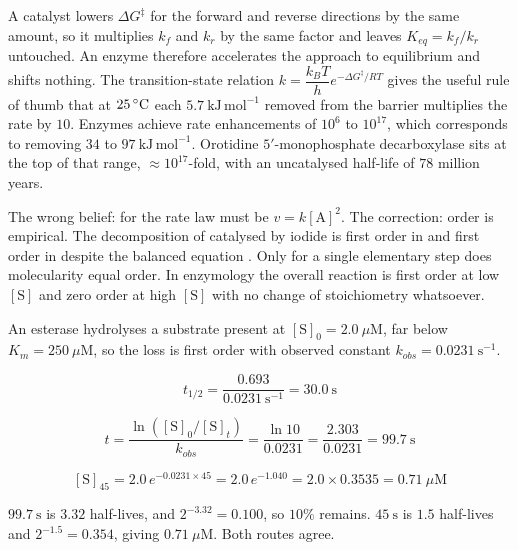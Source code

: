 \begin{thmbox}[title={PRINCIPLE: enzymes change the rate constant, never the equilibrium}]
A catalyst lowers $\Delta G^{\ddagger}$ for the forward and reverse directions by the
same amount, so it multiplies $k_f$ and $k_r$ by the same factor and leaves
$K_{eq}=k_f/k_r$ untouched. An enzyme therefore accelerates the approach to
equilibrium and shifts nothing.
The transition-state relation
$k=\dfrac{k_BT}{h}e^{-\Delta G^{\ddagger}/RT}$ gives the useful rule of thumb that at
$25\,^{\circ}\mathrm{C}$ each $5.7\ \mathrm{kJ\,mol^{-1}}$ removed from the barrier multiplies the
rate by $10$. Enzymes achieve rate enhancements of $10^{6}$ to $10^{17}$, which
corresponds to removing $34$ to $97\ \mathrm{kJ\,mol^{-1}}$. Orotidine
$5'$-monophosphate decarboxylase sits at the top of that range,
$\approx 10^{17}$-fold, with an uncatalysed half-life of $78$ million years.
\end{thmbox}

\begin{warnbox}[title={TRAP: order read off the stoichiometric equation}]
The wrong belief: for  the rate law must be $v=k[\mathrm{A}]^2$. The
correction: order is empirical. The decomposition of  catalysed by iodide is
first order in  and first order in  despite the balanced equation
. Only for a single elementary step does molecularity equal
order. In enzymology the overall reaction  is first order at low
$[\mathrm{S}]$ and zero order at high $[\mathrm{S}]$ with no change of stoichiometry
whatsoever.
\end{warnbox}

\begin{calcbox}[title={WORKED: first-order decay of a labelled substrate}]
An esterase hydrolyses a substrate present at $[\mathrm{S}]_0=2.0\ \mu\mathrm{M}$,
far below $K_m=250\ \mu\mathrm{M}$, so the loss is first order with observed constant
$k_{obs}=0.0231\ \mathrm{s^{-1}}$.

\[
t_{1/2}=\frac{0.693}{0.0231\ \mathrm{s^{-1}}}=30.0\ \mathrm{s}
\]

\[
t=\frac{\ln([\mathrm{S}]_0/[\mathrm{S}]_t)}{k_{obs}}
=\frac{\ln 10}{0.0231}=\frac{2.303}{0.0231}=99.7\ \mathrm{s}
\]

\[
[\mathrm{S}]_{45}=2.0\,e^{-0.0231\times 45}=2.0\,e^{-1.040}=2.0\times 0.3535
=0.71\ \mu\mathrm{M}
\]

 $99.7\ \mathrm{s}$ is $3.32$ half-lives, and
$2^{-3.32}=0.100$, so $10\%$ remains. $45\ \mathrm{s}$ is $1.5$ half-lives and
$2^{-1.5}=0.354$, giving $0.71\ \mu\mathrm{M}$. Both routes agree. \tm{$\surd$}
\end{calcbox}

